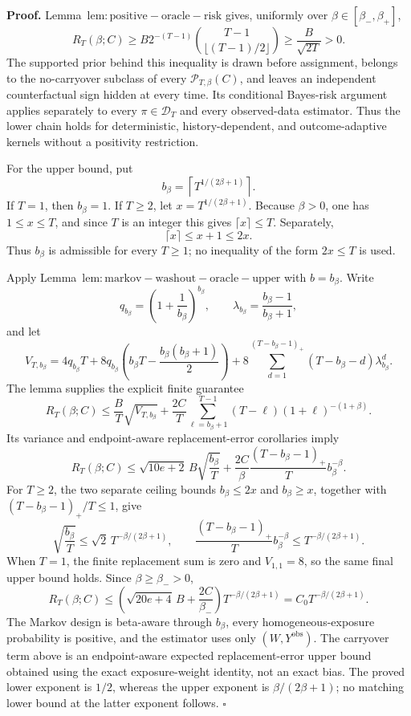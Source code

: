 \textbf{Proof.} Lemma~\(\mathrm{lem:positive-oracle-risk}\) gives, uniformly over \(\beta\in[\beta_-,\beta_+]\),
\[
R_T(\beta;C)
\ge B2^{-(T-1)}\binom{T-1}{\lfloor(T-1)/2\rfloor}
\ge\frac{B}{\sqrt{2T}}>0.
\]
The supported prior behind this inequality is drawn before assignment, belongs to the no-carryover subclass of every \(\mathcal P_{T,\beta}(C)\), and leaves an independent counterfactual sign hidden at every time. Its conditional Bayes-risk argument applies separately to every \(\pi\in\mathcal D_T\) and every observed-data estimator. Thus the lower chain holds for deterministic, history-dependent, and outcome-adaptive kernels without a positivity restriction.

For the upper bound, put
\[
b_\beta=\left\lceil T^{1/(2\beta+1)}\right\rceil.
\]
If \(T=1\), then \(b_\beta=1\). If \(T\ge2\), let \(x=T^{1/(2\beta+1)}\). Because \(\beta>0\), one has \(1\le x\le T\), and since \(T\) is an integer this gives \(\lceil x\rceil\le T\). Separately,
\[
\lceil x\rceil\le x+1\le2x.
\]
Thus \(b_\beta\) is admissible for every \(T\ge1\); no inequality of the form \(2x\le T\) is used.

Apply Lemma~\(\mathrm{lem:markov-washout-oracle-upper}\) with \(b=b_\beta\). Write
\[
q_{b_\beta}=\left(1+\frac1{b_\beta}\right)^{b_\beta},
\qquad
\lambda_{b_\beta}=\frac{b_\beta-1}{b_\beta+1},
\]
and let
\[
V_{T,b_\beta}=4q_{b_\beta}T+8q_{b_\beta}\left(b_\beta T-\frac{b_\beta(b_\beta+1)}2\right)
+8\sum_{d=1}^{(T-b_\beta-1)_+}(T-b_\beta-d)\lambda_{b_\beta}^d.
\]
The lemma supplies the explicit finite guarantee
\[
R_T(\beta;C)
\le\frac BT\sqrt{V_{T,b_\beta}}
+\frac{2C}{T}\sum_{\ell=b_\beta+1}^{T-1}(T-\ell)(1+\ell)^{-(1+\beta)}.
\]
Its variance and endpoint-aware replacement-error corollaries imply
\[
R_T(\beta;C)
\le \sqrt{10e+2}\,B\sqrt{\frac{b_\beta}{T}}
+\frac{2C}{\beta}\frac{(T-b_\beta-1)_+}{T}b_\beta^{-\beta}.
\]
For \(T\ge2\), the two separate ceiling bounds \(b_\beta\le2x\) and \(b_\beta\ge x\), together with \((T-b_\beta-1)_+/T\le1\), give
\[
\sqrt{\frac{b_\beta}{T}}
\le\sqrt2\,T^{-\beta/(2\beta+1)},
\qquad
\frac{(T-b_\beta-1)_+}{T}b_\beta^{-\beta}
\le T^{-\beta/(2\beta+1)}.
\]
When \(T=1\), the finite replacement sum is zero and \(V_{1,1}=8\), so the same final upper bound holds. Since \(\beta\ge\beta_->0\),
\[
R_T(\beta;C)
\le\left(\sqrt{20e+4}\,B+\frac{2C}{\beta_-}\right)
T^{-\beta/(2\beta+1)}
=C_0T^{-\beta/(2\beta+1)}.
\]
The Markov design is beta-aware through \(b_\beta\), every homogeneous-exposure probability is positive, and the estimator uses only \((W,Y^{\mathrm{obs}})\). The carryover term above is an endpoint-aware expected replacement-error upper bound obtained using the exact exposure-weight identity, not an exact bias. The proved lower exponent is \(1/2\), whereas the upper exponent is \(\beta/(2\beta+1)\); no matching lower bound at the latter exponent follows. \(\square\)